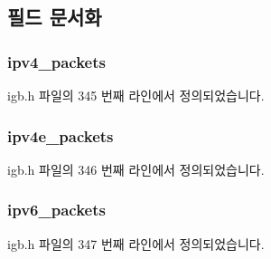 \subsection{필드 문서화}
\subsubsection[{\texorpdfstring{ipv4\+\_\+packets}{ipv4_packets}}]{ ipv4\+\_\+packets}\hypertarget{structigb__rx__packet__stats_a3ff32dae64faebe642e2d889b76c294a}{}\label{structigb__rx__packet__stats_a3ff32dae64faebe642e2d889b76c294a}


igb.\+h 파일의 345 번째 라인에서 정의되었습니다.

\subsubsection[{\texorpdfstring{ipv4e\+\_\+packets}{ipv4e_packets}}]{ ipv4e\+\_\+packets}\hypertarget{structigb__rx__packet__stats_a781281956565ebe876de958881004048}{}\label{structigb__rx__packet__stats_a781281956565ebe876de958881004048}


igb.\+h 파일의 346 번째 라인에서 정의되었습니다.

\subsubsection[{\texorpdfstring{ipv6\+\_\+packets}{ipv6_packets}}]{ ipv6\+\_\+packets}\hypertarget{structigb__rx__packet__stats_a714c0f76258e9051af35a08bdd71c0e0}{}\label{structigb__rx__packet__stats_a714c0f76258e9051af35a08bdd71c0e0}


igb.\+h 파일의 347 번째 라인에서 정의되었습니다.

